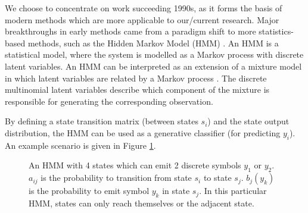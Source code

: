 \documentclass[12pt]{llncs}
\begin{document}
We choose to concentrate on work succeeding 1990s, as it forms the basis of modern methods which are more applicable to our/current research. Major breakthroughs in early methods came from a paradigm shift to more statistics-based methods, such as the Hidden Markov Model (HMM) \cite{juang2005automatic}. An HMM is a statistical model, where the system is modelled as a Markov process with discrete latent variables. An HMM can be interpreted as an extension of a mixture model in which latent variables are related by a Markov process \cite{bishop2006pattern}. The discrete multinomial latent variables describe which component of the mixture is responsible for generating the corresponding observation.

By defining a state transition matrix (between states $s_i$) and the state output distribution, the HMM can be used as a generative classifier (for predicting $y_i$). An example scenario is given in Figure \ref{fig:HMM}.

\begin{figure}[htbp]
\begin{center}
\end{center}
\caption{An HMM with 4 states which can emit 2 discrete symbols $y_1$ or $y_2$.
$a_{ij}$ is the probability to transition from state $s_i$ to state $s_j$.
$b_j(y_k)$ is the probability to emit symbol $y_k$ in state $s_j$.
In this particular HMM, states can only reach themselves or the adjacent state.}
\label{fig:HMM}
\end{figure}
\end{document}
